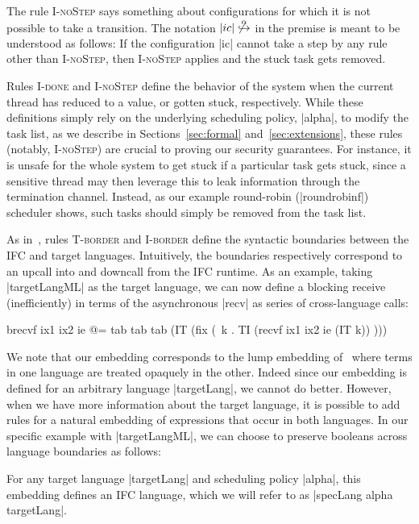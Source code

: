The rule \textsc{I-noStep} says something about configurations for which
it is not possible to take a transition.  The notation
$|ic|\not\overset{\alpha}{\hookrightarrow}$ in the premise
is meant to be understood as
follows:  If the configuration |ic| cannot take a step by any rule other
than \textsc{I-noStep}, then \textsc{I-noStep} applies and the
stuck task gets removed.

Rules \textsc{I-done} and \textsc{I-noStep} define the behavior of the system
when the current thread has reduced to a value, or gotten stuck, respectively.
%
While these definitions simply rely on the underlying scheduling policy,
|alpha|, to modify the task list, as we describe in Sections~\ref{sec:formal}
and~\ref{sec:extensions}, these rules (notably, \textsc{I-noStep}) are crucial
to proving our security guarantees.
%
For instance, it is unsafe for the whole system to get stuck if a particular
task gets stuck, since a sensitive thread may then leverage this to leak
information through the termination channel.
%
Instead, as our example round-robin (|roundrobinf|) scheduler shows,
such tasks should simply be removed from the task list.

%
As in~\cite{Matthews:2007:OSM:1190216.1190220}, rules \textsc{T-border} and
\textsc{I-border} define the syntactic boundaries between the IFC and target
languages.
%
Intuitively, the boundaries respectively correspond to an upcall into and
downcall from the IFC runtime.
%
As an example, taking |targetLangML| as the target language, we can now define a
blocking receive (inefficiently) in terms of the asynchronous |recv| as series
of cross-language calls:
\begin{code}
  brecvf ix1 ix2 ie @=
  tab tab tab (IT (fix (\ k . TI (recvf ix1 ix2 ie (IT k)) )))
\end{code}

We note that our embedding corresponds to the lump embedding
of~\cite{Matthews:2007:OSM:1190216.1190220} where terms in one language are
treated opaquely in the other.
%
Indeed since our embedding is defined for an arbitrary language |targetLang|,
we cannot do better.
%
However, when we have more information about the target language, it is
possible to add rules for a natural embedding of expressions that occur in both
languages.  In our specific example with |targetLangML|, we can choose to
preserve booleans across language boundaries as follows:

For any target language |targetLang| and scheduling policy |alpha|, this
embedding defines an IFC language, which we will
refer to as |specLang alpha targetLang|.
